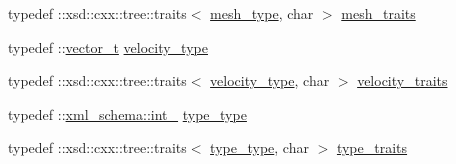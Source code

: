 \begin{DoxyCompactItemize}
\item 
typedef \+::xsd\+::cxx\+::tree\+::traits$<$ \hyperlink{classmembrane__t_a259dfb54e3d4a66cdd72b5b0831f4188}{mesh\+\_\+type}, char $>$ \hyperlink{classmembrane__t_a6b611201cacd05e394dc2d6750a33ff9}{mesh\+\_\+traits}
\item 
typedef \+::\hyperlink{classvector__t}{vector\+\_\+t} \hyperlink{classmembrane__t_a41bad26c4626a8ceac158b3817306c62}{velocity\+\_\+type}
\item 
typedef \+::xsd\+::cxx\+::tree\+::traits$<$ \hyperlink{classmembrane__t_a41bad26c4626a8ceac158b3817306c62}{velocity\+\_\+type}, char $>$ \hyperlink{classmembrane__t_aa9cbbb0853e5efae969241a0bfe951b6}{velocity\+\_\+traits}
\item 
typedef \+::\hyperlink{namespacexml__schema_acfa24ac68e1a188e7f44c36f7a158bf4}{xml\+\_\+schema\+::int\+\_\+} \hyperlink{classmembrane__t_a13eb0ee51a5a6018151503690e28e2fb}{type\+\_\+type}
\item 
typedef \+::xsd\+::cxx\+::tree\+::traits$<$ \hyperlink{classmembrane__t_a13eb0ee51a5a6018151503690e28e2fb}{type\+\_\+type}, char $>$ \hyperlink{classmembrane__t_ac54c3884b125d2a162ce454e82f4da69}{type\+\_\+traits}
\end{DoxyCompactItemize}
